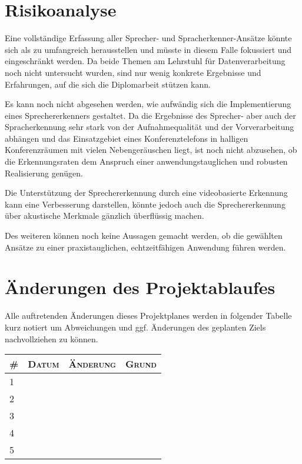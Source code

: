 \documentclass[lang=ngerman,inputenc=utf8,fontsize=10pt]{ldvarticle}
\begin{document}
\section{Risikoanalyse}

Eine vollständige Erfassung aller Sprecher- und Spracherkenner-Ansätze könnte sich als zu umfangreich herausstellen und müsste in diesem Falle fokussiert und eingeschränkt werden. Da beide Themen am Lehrstuhl für Datenverarbeitung noch nicht untersucht wurden, sind nur wenig konkrete Ergebnisse und Erfahrungen, auf die sich die Diplomarbeit stützen kann.

Es kann noch nicht abgesehen werden, wie aufwändig sich die Implementierung eines Sprechererkenners gestaltet. Da die Ergebnisse des Sprecher- aber auch der Spracherkennung sehr stark von der Aufnahmequalität und der Vorverarbeitung abhängen und das Einsatzgebiet eines Konferenztelefons in halligen Konferenzräumen mit vielen Nebengeräuschen liegt, ist noch nicht abzusehen, ob die Erkennungsraten dem Anspruch einer anwendungstauglichen und robusten Realisierung genügen.

Die Unterstützung der Sprechererkennung durch eine videobasierte Erkennung kann eine Verbesserung darstellen, könnte jedoch auch die Sprechererkennung über akustische Merkmale gänzlich überflüssig machen.

Des weiteren können noch keine Aussagen gemacht werden, ob die gewählten Ansätze zu einer praxistauglichen, echtzeitfähigen Anwendung führen werden.



\section{Änderungen des Projektablaufes}
Alle auftretenden Änderungen dieses Projektplanes werden in folgender Tabelle kurz notiert um Abweichungen und ggf. Änderungen des geplanten Ziels nachvollziehen zu können.

\begin{tabular}[htbp]{|p{}||p{}|p{}|p{}|}
	\hline
	\textsc{\#} & \textsc{Datum} & \textsc{Änderung} & \textsc{Grund} \\
	\hline
	\hline
	1 & & & \\[1em]
	\hline
	2 & & & \\[1em]
	\hline
	3 & & & \\[1em]
	\hline
	4 & & & \\[1em]
	\hline
	5 & & & \\[1em]
	\hline
\end{tabular}
\end{document}
